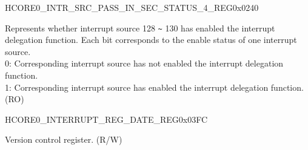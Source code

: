 \begin{register}{H}{CORE0\_INTR\_SRC\_PASS\_IN\_SEC\_STATUS\_4\_REG}{0x0240}\label{regdesc:CORE0INTRSRCPASSINSECSTATUS4REG}
%
\regnewline%
\begin{regdesc}\begin{reglist}
\label{fielddesc:CORE0INTRSRCPASSINSECSTATUS4}\item [CORE0\_INTR\_SRC\_PASS\_IN\_SEC\_STATUS\_4] Represents whether interrupt source 128 \verb+~+ 130 has enabled the interrupt delegation function. Each bit corresponds to the enable status of one interrupt source.\\
0: Corresponding interrupt source has not enabled the interrupt delegation function.\\
1: Corresponding interrupt source has enabled the interrupt delegation function.\\
(RO)
\end{reglist}\end{regdesc}
\end{register}

\begin{register}{H}{CORE0\_INTERRUPT\_REG\_DATE\_REG}{0x03FC}\label{regdesc:CORE0INTERRUPTREGDATEREG}
%
%
\regnewline%
\begin{regdesc}\begin{reglist}
\label{fielddesc:CORE0INTERRUPTREGDATE}\item [CORE0\_INTERRUPT\_REG\_DATE] Version control register. (R/W)
\end{reglist}\end{regdesc}
\end{register}

